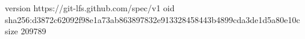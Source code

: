 version https://git-lfs.github.com/spec/v1
oid sha256:d3872c62092f98e1a73ab863897832e913328458443b4899cda3de1d5a80e10c
size 209789
